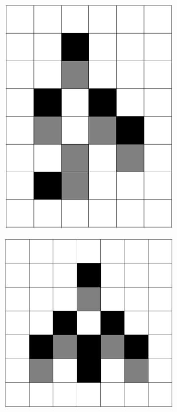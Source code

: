 \documentclass[12pt]{article}
\numberwithin{figure}{section} %
\begin{document}
\begin{figure}[H]
\begin{subfigure}{0.18\textwidth}
     		\includegraphics[angle=270,width=\linewidth]{Section4/8.2}
     		\subcaption{}
   	\end{subfigure}
        	\begin{subfigure}{0.18\textwidth}
     		\centering
     		\includegraphics[angle=270,width=\linewidth]{Section4/8.3}

\end{subfigure}
\end{figure}
\end{document}
